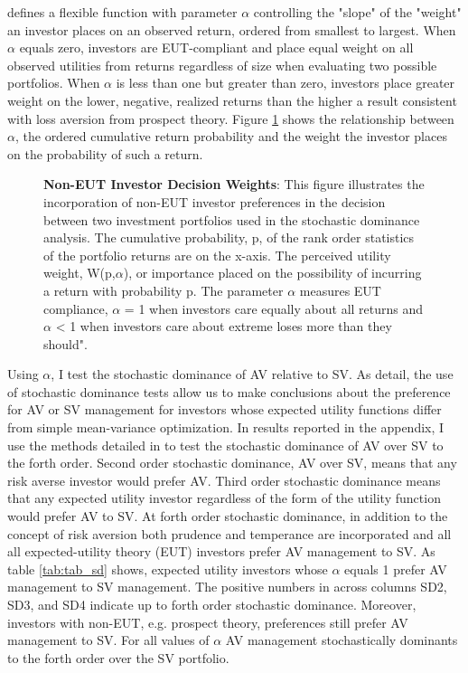 \citet{prelec_probability_1998} defines a flexible function with parameter $\alpha$ controlling the "slope" of the "weight" an investor places on an observed return, ordered from smallest to largest. When $\alpha$ equals zero, investors are EUT-compliant and place equal weight on all observed utilities from returns regardless of size when evaluating two possible portfolios. When $\alpha$ is less than one but greater than zero, investors place greater weight on the lower, negative, realized returns than the higher a result consistent with loss aversion from prospect theory. Figure \ref{fig:sd_ill_graph} shows the relationship between $\alpha$, the ordered cumulative return probability and the weight the investor places on the probability of such a return.\\
\begin{figure}[htb]
	\centering
	\caption{{\bf Non-EUT Investor Decision Weights}: This figure illustrates the incorporation of non-EUT investor preferences in the decision between two investment portfolios used in the stochastic dominance analysis. The cumulative probability, p, of the rank order statistics of the portfolio returns are on the x-axis. The perceived utility weight, W(p,$\alpha$), or importance placed on the possibility of incurring a return with probability p. The parameter $\alpha$ measures EUT compliance, $\alpha$ = 1 when investors care equally about all returns and $\alpha$ < 1 when investors care about extreme loses more than they should".} \label{fig:sd_ill_graph}
	
\end{figure}
Using $\alpha$, I test the stochastic dominance of AV relative to SV. As \citet{hadar_rules_1969,hanoch_efficiency_1969,rothschild_increasing_1970,levy_experimental_2002} detail, the use of stochastic dominance tests allow us to make conclusions about the preference for AV or SV management for investors whose expected utility functions differ from simple mean-variance optimization. In results reported in the appendix, I use the methods detailed in \citet{vinod_h.d._ranking_2004,vinod_hands-intermediate_2008} to test the stochastic dominance of AV over SV to the forth order. Second order stochastic dominance, AV over SV, means that any risk averse investor would prefer AV. \citep{mcfadden_testing_1989,valle_novel_2017} Third order stochastic dominance means that any expected utility investor regardless of the form of the utility function would prefer AV to SV. \citep{whitmore_third-degree_1970,chan_third_2016} At forth order stochastic dominance, in addition to the concept of risk aversion both prudence and temperance are incorporated and all all expected-utility theory (EUT) investors prefer AV management to SV. \citep{kimball_standard_1993,noauthor_risk-aversion_nodate} As table \ref{tab:tab_sd} shows, expected utility investors whose $\alpha$ equals 1 prefer AV management to SV management. The positive numbers in across columns SD2, SD3, and SD4 indicate up to forth order stochastic dominance. Moreover, investors with non-EUT, e.g. prospect theory, preferences still prefer AV management to SV. \citep{kahneman_prospect_1979} For all values of $\alpha$ AV management stochastically dominants to the forth order over the SV portfolio.


